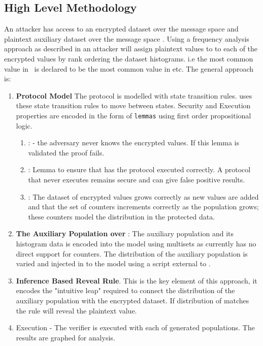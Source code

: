 \documentclass[journal]{IEEEtran}
\begin{document}
\subsection{High Level Methodology}
An attacker has access to an encrypted dataset \enc{} over the message space \encSpace{} and plaintext auxiliary dataset \aux{} over the message space \auxSpace. Using a frequency analysis approach as described in \cite{InfrenceAttacks} an attacker will assign plaintext values to to each of the encrypted values by rank ordering the dataset histograms. i.e the most common value in \enc{}\ is declared to be the most common value in \aux{} etc. 
The general approach is:
\begin{enumerate}[label=(\Alph*)]
\item \textbf{Protocol Model} The protocol is modelled with \tamarin{} state transition rules. \tamarin{} uses these state transition rules to move between states. Security and Execution properties are encoded in the form of \texttt{lemmas} using first order propositional logic. 
\begin{enumerate}
	\item {}: - the adversary never knows the encrypted values. If this lemma is validated the proof fails.
    \item {}: Lemma to ensure that has the protocol executed correctly. A protocol that never executes remains secure and can give false positive results.
	\item {}: The dataset of encrypted values grows correctly as new values are added and that the set of counters increments correctly as the population grows; these counters model the distribution in the protected data.
\end{enumerate}

\item \textbf{The Auxiliary Population \aux{} over \auxSpace}: The auxiliary population and its histogram data is encoded into the model using \tamarin{} multisets as \tamarin{} currently has no direct support for counters. The distribution of the auxiliary population is varied and injected in to the model using a script external to \tamarin{}.
\item\textbf{ Inference Based Reveal Rule}. This is the key element of this approach, it encodes the "intuitive leap" required to connect the distribution of the auxiliary population with the encrypted dataset.   If  distribution of \aux{} matches \enc{} the rule will reveal the plaintext value.
\item Execution
	- The \tamarin{} verifier is executed with each of generated \aux{} populations. The results are graphed for analysis.
\end{enumerate}
\end{document}
